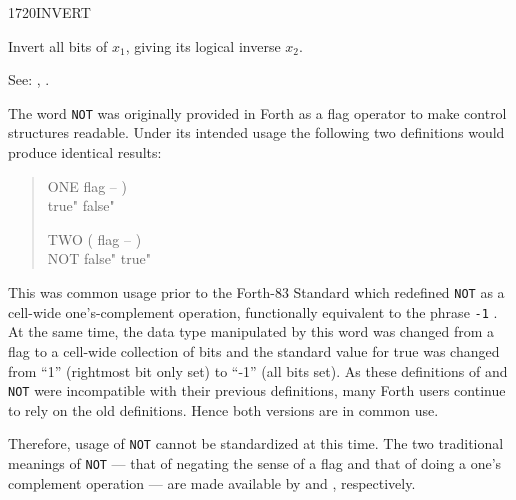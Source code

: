 \begin{newword}{1720}{INVERT}

	Invert all bits of $x_1$, giving its logical inverse $x_2$.

\item[See:]
	,
	.

	\begin{rationale} %
		The word \texttt{NOT} was originally provided in Forth as a
		flag operator to make control structures readable. Under its
		intended usage the following two definitions would produce
		identical results:

		\begin{quote}\ttfamily
			\word{:} ONE  flag -- ) \\
			\tab {}
					 true"
					 false"
			\word{;}

			\word{:} TWO ( flag -- ) \\
			\tab NOT 
					 false"
					 true"
			\word{;}
		\end{quote}

		This was common usage prior to the Forth-83 Standard which
		redefined \texttt{NOT} as a cell-wide one's-complement
		operation, functionally equivalent to the phrase \texttt{-1}
		. At the same time, the data type manipulated by
		this word was changed from a flag to a cell-wide collection of
		bits and the standard value for true was changed from ``1''
		(rightmost bit only set) to ``-1'' (all bits set). As these
		definitions of  and \texttt{NOT} were incompatible
		with their previous definitions, many Forth users continue to
		rely on the old definitions. Hence both versions are in common
		use.

		Therefore, usage of \texttt{NOT} cannot be standardized at
		this time. The two traditional meanings of \texttt{NOT} ---
		that of negating the sense of a flag and that of doing a one's
		complement operation --- are made available by  and
		, respectively.
	\end{rationale}
\end{newword}



